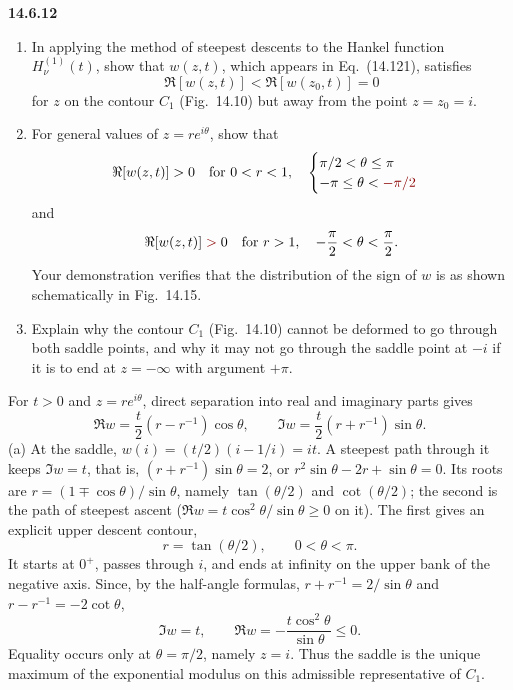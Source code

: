 \par\bigskip
\noindent\textbf{14.6.12}
\begin{enumerate}
\item[(a)] In applying the method of steepest descents to the Hankel
function $H_{\nu}^{(1)}(t)$, show that $w(z,t)$, which appears in
Eq.~(14.121), satisfies
\[
\Re[w(z,t)]<\Re[w(z_{0},t)]=0
\]
for $z$ on the contour $C_{1}$ (Fig.~14.10) but away from the point
$z=z_{0}=i$.
\item[(b)] For general values of $z=re^{i\theta}$, show that
\[
\Re[w(z,t)]>0\quad\text{for }0<r<1,\quad
\begin{cases}\pi/2<\theta\le\pi\\-\pi\le\theta<\erratum{-\pi/2}\end{cases}
\]
and
\[
\Re[w(z,t)]\mathrel{\erratum{>}}0\quad\text{for }r>1,\quad-\frac{\pi}{2}<\theta<\frac{\pi}{2}.
\]
Your demonstration verifies that the distribution of the sign of $w$
is as shown schematically in Fig.~14.15.
\item[(c)] Explain why the contour $C_{1}$ (Fig.~14.10) cannot be
deformed to go through both saddle points, and why it may not go
through the saddle point at $-i$ if it is to end at $z=-\infty$ with
argument $+\pi$.
\end{enumerate}
\par{}
\solution
For $t>0$ and $z=re^{i\theta}$, direct separation into real and
imaginary parts gives
\[
\boxed{\Re w=\frac t2(r-r^{-1})\cos\theta,\qquad
\Im w=\frac t2(r+r^{-1})\sin\theta}.
\]
(a) At the saddle, $w(i)=(t/2)(i-1/i)=it$. A steepest path through
it keeps $\Im w=t$, that is, $(r+r^{-1})\sin\theta=2$, or
$r^2\sin\theta-2r+\sin\theta=0$. Its roots are
$r=(1\mp\cos\theta)/\sin\theta$, namely $\tan(\theta/2)$ and
$\cot(\theta/2)$; the second is the path of steepest ascent
($\Re w=t\cos^2\theta/\sin\theta\ge0$ on it). The first gives an
explicit upper descent contour,
\[
r=\tan(\theta/2),\qquad0<\theta<\pi.
\]
It starts at $0^+$, passes through $i$, and ends at infinity on
the upper bank of the negative axis. Since, by the half-angle
formulas, $r+r^{-1}=2/\sin\theta$ and $r-r^{-1}=-2\cot\theta$,
\[
\Im w=t,\qquad
\Re w=-\frac{t\cos^2\theta}{\sin\theta}\le0.
\]
Equality occurs only at $\theta=\pi/2$, namely $z=i$.
Thus the saddle is the unique maximum of the exponential modulus
on this admissible representative of $C_1$.

